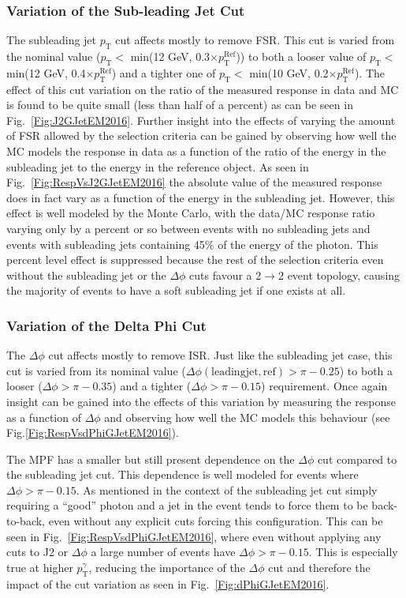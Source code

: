 \subsubsection{Variation of the Sub-leading Jet Cut}
The subleading jet $p_{\mathrm T}$ cut affects mostly to remove FSR.
This cut is varied from the nominal value ($p_{\mathrm T}<$ min(12 GeV, 0.3$\times p_{\mathrm T}^{\mathrm {Ref}}$)) to both a looser value of $p_{\mathrm T}<$ min(12 GeV, 0.4$\times p_{\mathrm T}^{\mathrm {Ref}}$) and a tighter one of $p_{\mathrm T}<$ min(10 GeV, 0.2$\times p_{\mathrm T}^{\mathrm {Ref}}$).
The effect of this cut variation on the ratio of the measured response in data and MC is found to be quite small (less than half of a percent) as can be seen in Fig.~\ref{Fig:J2GJetEM2016}.
Further insight into the effects of varying the amount of FSR allowed by the selection criteria can be gained by observing how well the MC models the response in data as a function 
of the ratio of the energy in the subleading jet to the energy in the reference object.
As seen in Fig.~\ref{Fig:RespVsJ2GJetEM2016} the absolute value of the measured response does in fact vary as a function of the energy in the subleading jet.
However, this effect is well modeled by the Monte Carlo, with the data/MC response ratio varying only by a percent or so between events with no subleading jets and events with subleading jets containing 45\% of the energy of the photon.
This percent level effect is suppressed because the rest of the selection criteria even without the subleading jet or the $\Delta\phi$ cuts favour a 2$\rightarrow$2 event topology, causing the majority of events to have a soft subleading jet if one exists at all.


\subsubsection{Variation of the Delta Phi Cut}
The $\Delta\phi$ cut affects mostly to remove ISR.  
Just like the subleading jet case, this cut is varied from its nominal value ($\Delta \phi \left({\mathrm {leading jet, ref}}\right)>\pi-0.25$) to both a looser ($\Delta\phi>\pi-0.35$) and a tighter ($\Delta\phi>\pi-0.15$) requirement.
Once again insight can be gained into the effects of this variation by measuring the response as a function of $\Delta\phi$ and observing how well the MC models this behaviour (see Fig.\ref{Fig:RespVsdPhiGJetEM2016}).  

The MPF has a smaller but still present dependence on the $\Delta\phi$ cut compared to the subleading jet cut.  
This dependence is well modeled for events where $\Delta\phi>\pi-0.15$.  
As mentioned in the context of the subleading jet cut simply requiring a ``good'' photon and a jet in the event tends to force them to be back-to-back, even without any explicit cuts forcing this configuration.  
This can be seen in Fig.~\ref{Fig:RespVsdPhiGJetEM2016}, where even without applying any cuts to J2 or $\Delta\phi$ a large number of events have $\Delta\phi>\pi-0.15$.  
This is especially true at higher $p_{\mathrm T}^{\gamma}$, reducing the importance of the $\Delta\phi$ cut and therefore the impact of the cut variation as seen in Fig.~\ref{Fig:dPhiGJetEM2016}.  

